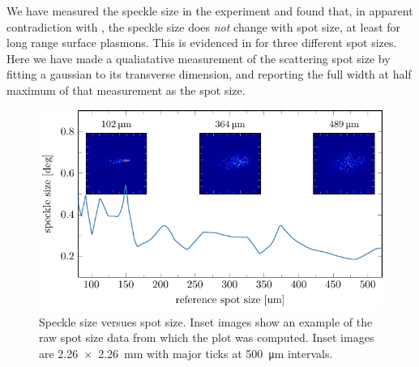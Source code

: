 We have measured the speckle size in the experiment and found that, in
apparent contradiction with , the speckle size does
\textit{not} change with spot size, at least for long range surface
plasmons.  This is evidenced in  for three different
spot sizes.  Here we have made a qualiatative measurement of the scattering
spot size by fitting a gaussian to its transverse dimension, and reporting
the full width at half maximum of that measurement as the spot size.

\begin{figure}[ht]
 \centering
 \includegraphics[keepaspectratio]{speckle/figures/spotsize/test.pdf}
 \caption{Speckle size versues spot size.  Inset images show an example of
 the raw spot size data from which the plot was computed.  Inset images are
 \SI{2.26x2.26}{\milli\meter} with major ticks at
 \SI{500}{\micro\meter} intervals.}
 \label{fig:spotsize}
\end{figure}

